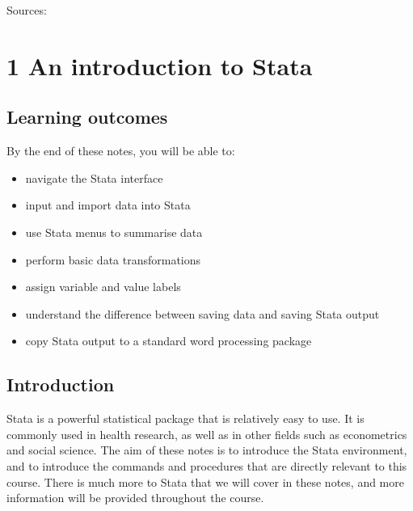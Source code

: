 \documentclass[
]{memoir}
\providecommand{\tightlist}{%
  \setlength{\itemsep}{0pt}\setlength{\parskip}{0pt}}
\begin{document}
Sources:

\citet{altman90}

\citet{cole15}

\citet{assel_etal19}

\hypertarget{an-introduction-to-stata}{%
\chapter*{\texorpdfstring{\textbf{1} An introduction to Stata}{1 An introduction to Stata}}\label{an-introduction-to-stata}}

\hypertarget{learning-outcomes}{%
\section*{Learning outcomes}\label{learning-outcomes}}

By the end of these notes, you will be able to:

\begin{itemize}
\tightlist
\item
  navigate the Stata interface
\item
  input and import data into Stata
\item
  use Stata menus to summarise data
\item
  perform basic data transformations
\item
  assign variable and value labels
\item
  understand the difference between saving data and saving Stata output
\item
  copy Stata output to a standard word processing package
\end{itemize}

\hypertarget{introduction}{%
\section*{Introduction}\label{introduction}}

Stata is a powerful statistical package that is relatively easy to use. It is commonly used in health research, as well as in other fields such as econometrics and social science. The aim of these notes is to introduce the Stata environment, and to introduce the commands and procedures that are directly relevant to this course. There is much more to Stata that we will cover in these notes, and more information will be provided throughout the course.
\end{document}
